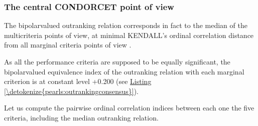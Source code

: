 \documentclass[a4paper,12pt,english]{sphinxhowto}
\begin{document}
\subsubsection{The central CONDORCET point of view}
\label{\detokenize{pearls:the-central-condorcet-point-of-view}}
\sphinxAtStartPar
The bipolar\sphinxhyphen{}valued outranking relation corresponds in fact to the median of the multicriteria points of view, at minimal KENDALL’s ordinal correlation distance from all marginal criteria points of view .
\def\sphinxLiteralBlockLabel{\label{\detokenize{pearls:outrankingconsensus}}}
\begin{sphinxVerbatim}[commandchars=\\\{\},numbers=left,firstnumber=1,stepnumber=1]
\end{sphinxVerbatim}

\sphinxAtStartPar
As all the performance criteria are supposed to be equally significant, the bipolar\sphinxhyphen{}valued equivalence index of the outranking relation with each marginal criterion is at constant level +0.200 (see \hyperref[\detokenize{pearls:outrankingconsensus}]{Listing \ref{\detokenize{pearls:outrankingconsensus}}}).

\sphinxAtStartPar
Let us compute the pairwise ordinal correlation indices between each one the five criteria, including the median outranking relation.
\end{document}
